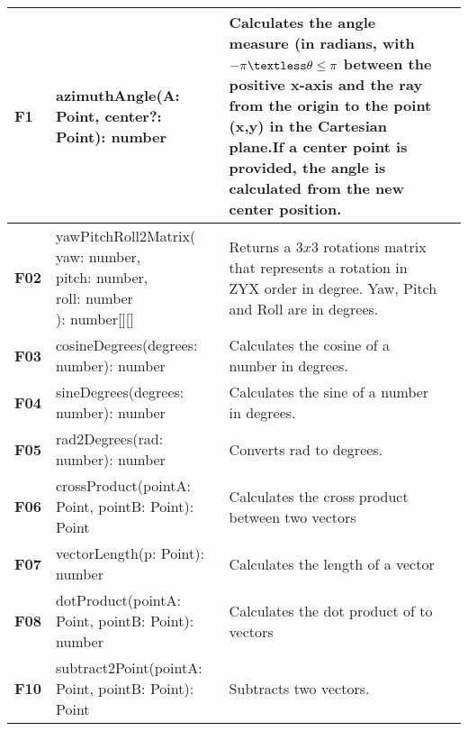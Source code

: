 \begin{xltabular}{\textwidth}{|M{1.2cm}|X|X|M{3cm}|}
\hline 
 \endlastfoot 
\textbf{ F1 } & {\ttfamily azimuthAngle(A: Point, center?: Point): number} & Calculates the angle measure (in radians, with $-\pi \textless \theta \le \pi$ between the positive x-axis and the ray from the origin to the point {\ttfamily(x,y)} in the Cartesian plane.\newline If a center point is provided, the angle is calculated from the new center position. &  \\ \hline 
  \textbf{F02} & {\ttfamily yawPitchRoll2Matrix( \newline yaw: number,\newline pitch: number,\newline roll: number\newline): number[][]} & Returns a $3x3$ rotations matrix that represents a rotation in ZYX order in degree. \newline Yaw, Pitch and Roll are in degrees. &  \\ \hline 
  \textbf{F03} & {\ttfamily cosineDegrees(degrees: number): number } & Calculates the cosine of a number in degrees. &  \\ \hline 
  \textbf{F04} & {\ttfamily sineDegrees(degrees: number): number} & Calculates the sine of a number in degrees. &  \\ \hline 
  \textbf{F05} & {\ttfamily rad2Degrees(rad: number): number} & Converts rad to degrees. &  \\ \hline 
  \textbf{F06} & {\ttfamily crossProduct(pointA: Point, pointB: Point): Point} & Calculates the cross product between two vectors &  \\ \hline 
  \textbf{F07} & {\ttfamily vectorLength(p: Point): number} & Calculates the length of a vector &  \\ \hline 
  \textbf{F08} & {\ttfamily dotProduct(pointA: Point, pointB: Point): number} & Calculates the dot product of to vectors &  \\ \hline 
  \textbf{F10} & {\ttfamily subtract2Point(pointA: Point, pointB: Point): Point} & Subtracts two vectors. &  \\ \hline 

\end{xltabular}
